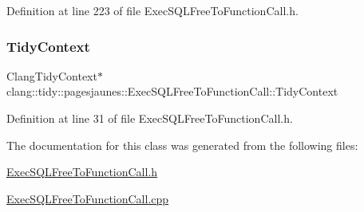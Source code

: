 Definition at line 223 of file Exec\+S\+Q\+L\+Free\+To\+Function\+Call.\+h.

\mbox{\label{classclang_1_1tidy_1_1pagesjaunes_1_1_exec_s_q_l_free_to_function_call_a238ae5f1ee7e1f64de152b45edbb529a}} 
\subsubsection{\texorpdfstring{Tidy\+Context}{TidyContext}}
{\footnotesize\ttfamily Clang\+Tidy\+Context$\ast$ clang\+::tidy\+::pagesjaunes\+::\+Exec\+S\+Q\+L\+Free\+To\+Function\+Call\+::\+Tidy\+Context}



Definition at line 31 of file Exec\+S\+Q\+L\+Free\+To\+Function\+Call.\+h.



The documentation for this class was generated from the following files\+:\begin{DoxyCompactItemize}
\item 
\hyperlink{_exec_s_q_l_free_to_function_call_8h}{Exec\+S\+Q\+L\+Free\+To\+Function\+Call.\+h}\item 
\hyperlink{_exec_s_q_l_free_to_function_call_8cpp}{Exec\+S\+Q\+L\+Free\+To\+Function\+Call.\+cpp}\end{DoxyCompactItemize}
